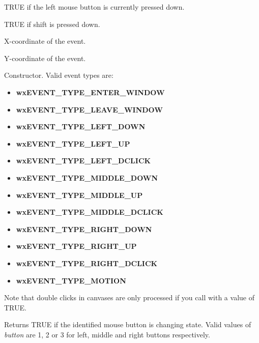 

TRUE if the left mouse button is currently pressed down.



TRUE if shift is pressed down.



X-coordinate of the event.



Y-coordinate of the event.



Constructor. Valid event types are:

\begin{itemize}\itemsep=0pt
\item {\bf wxEVENT\_TYPE\_ENTER\_WINDOW}
\item {\bf wxEVENT\_TYPE\_LEAVE\_WINDOW}
\item {\bf wxEVENT\_TYPE\_LEFT\_DOWN}
\item {\bf wxEVENT\_TYPE\_LEFT\_UP}
\item {\bf wxEVENT\_TYPE\_LEFT\_DCLICK}
\item {\bf wxEVENT\_TYPE\_MIDDLE\_DOWN}
\item {\bf wxEVENT\_TYPE\_MIDDLE\_UP}
\item {\bf wxEVENT\_TYPE\_MIDDLE\_DCLICK}
\item {\bf wxEVENT\_TYPE\_RIGHT\_DOWN}
\item {\bf wxEVENT\_TYPE\_RIGHT\_UP}
\item {\bf wxEVENT\_TYPE\_RIGHT\_DCLICK}
\item {\bf wxEVENT\_TYPE\_MOTION}
\end{itemize}

Note that double clicks in canvases are only processed if you call  with a value of TRUE. 



Returns TRUE if the identified mouse button is changing state. Valid
values of {\it button} are 1, 2 or 3 for left, middle and right
buttons respectively.

